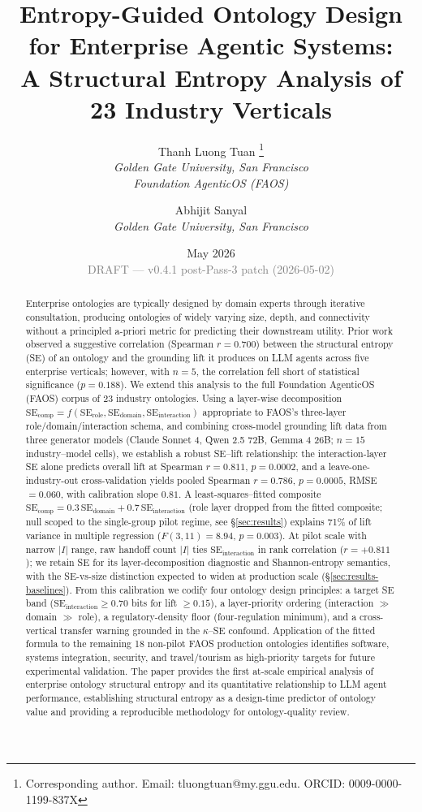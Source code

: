 \documentclass[11pt,a4paper]{article}
\title{%
  Entropy-Guided Ontology Design for Enterprise Agentic Systems:\\
  A Structural Entropy Analysis of 23 Industry Verticals%
}
\author{%
  Thanh Luong Tuan%
  \thanks{Corresponding author. Email: tluongtuan@my.ggu.edu.
    ORCID: 0009-0000-1199-837X} \\
  \textit{Golden Gate University, San Francisco} \\
  \textit{Foundation AgenticOS (FAOS)}
  \and
  Abhijit Sanyal \\
  \textit{Golden Gate University, San Francisco}
}
\date{May 2026 \\ {\small \textcolor{gray}{DRAFT --- v0.4.1 post-Pass-3 patch (2026-05-02)}}}
\newcommand{\faos}{\textsc{FAOS}}
\newcommand{\se}{\mathrm{SE}}
\newcommand{\serole}{\se_{\text{role}}}
\newcommand{\sedom}{\se_{\text{domain}}}
\newcommand{\seint}{\se_{\text{interaction}}}
\newcommand{\secomp}{\se_{\text{comp}}}
\begin{document}
\maketitle

\begin{abstract}
Enterprise ontologies are typically designed by domain experts through
iterative consultation, producing ontologies of widely varying size,
depth, and connectivity without a principled a-priori metric for
predicting their downstream utility. Prior work \citep{luong2026neurosymbolic}
observed a suggestive correlation (Spearman $r = 0.700$) between the
structural entropy (SE) of an ontology and the grounding lift it produces
on LLM agents across five enterprise verticals; however, with $n = 5$,
the correlation fell short of statistical significance ($p = 0.188$).
We extend this analysis to the full Foundation AgenticOS (\faos{})
corpus of 23 industry ontologies. Using a layer-wise decomposition
$\secomp = f(\serole, \sedom, \seint)$ appropriate to \faos{}'s
three-layer role/domain/interaction schema, and combining cross-model
grounding lift data from three generator models (Claude Sonnet 4, Qwen
2.5 72B, Gemma 4 26B; $n = 15$ industry--model cells), we establish
a robust SE--lift relationship: the interaction-layer SE alone predicts
overall lift at Spearman $r = 0.811$, $p = 0.0002$, and a leave-one-%
industry-out cross-validation yields pooled Spearman $r = 0.786$,
$p = 0.0005$, RMSE $= 0.060$, with calibration slope $0.81$. A
least-squares--fitted composite
$\secomp = 0.3\,\sedom + 0.7\,\seint$ (role layer dropped from the
fitted composite; null scoped to the single-group pilot regime,
see \S\ref{sec:results}) explains 71\% of lift variance in multiple
regression
($F(3, 11) = 8.94$, $p = 0.003$). At pilot scale with narrow $|I|$
range, raw handoff count $|I|$ ties $\seint$ in rank correlation
($r = +0.811$); we retain SE for its layer-decomposition diagnostic
and Shannon-entropy semantics, with the SE-vs-size distinction
expected to widen at production scale (\S\ref{sec:results-baselines}).
From this calibration we codify four
ontology design principles: a target SE band
($\seint \geq 0.70$ bits for lift $\geq 0.15$), a layer-priority
ordering (interaction $\gg$ domain $\gg$ role), a regulatory-density
floor (four-regulation minimum), and a cross-vertical transfer warning
grounded in the $\kappa$--SE confound. Application of the fitted formula
to the remaining 18 non-pilot \faos{} production ontologies identifies
software, systems integration, security, and travel/tourism as
high-priority targets for future experimental validation. The paper
provides the first at-scale empirical analysis of enterprise ontology
structural entropy and its quantitative relationship to LLM agent
performance, establishing structural entropy as a design-time predictor
of ontology value and providing a reproducible methodology for
ontology-quality review.


\end{abstract}
\end{document}
